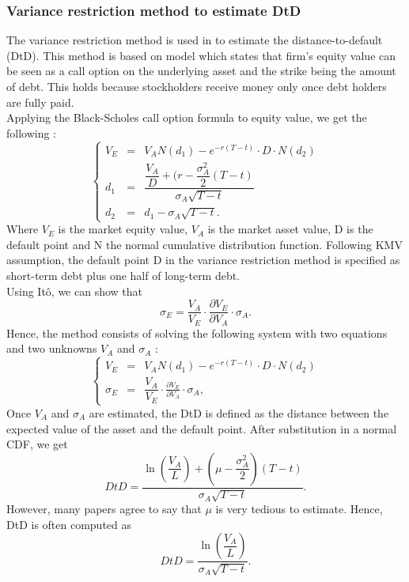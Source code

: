 \subsubsection{Variance restriction method to estimate DtD}
The variance restriction method is used in \citet{DSW} to estimate the distance-to-default (DtD). This method is based on \citet{Merton1974} model which states that firm's equity value can be seen as a call option on the underlying asset and the strike being the amount of debt. This holds because stockholders receive money only once debt holders are fully paid. \\
Applying the Black-Scholes call option formula to equity value, we get the following :
\begin{equation*}
\left\{
  \begin{array}{lll}
    V_E & = & V_A N(d_1) - e^{-r(T-t)} \cdot D \cdot N(d_2)\\
    d_1 & = & \dfrac{\dfrac{V_A}{D}+(r-\dfrac{\sigma_A^2}{2}(T-t)}{\sigma_A \sqrt{T-t}} \\
    d_2 & = & d_1 - \sigma_A \sqrt{T-t}.
  \end{array}
\right.
\end{equation*}
Where $V_E$ is the market equity value, $V_A$ is the market asset value, D is the default point and N the normal cumulative distribution function. Following KMV assumption, the default point D in the variance restriction method is specified as short-term debt plus one half of long-term debt.\\
Using It\^o, we can show that 
\begin{equation*}
\sigma_E = \dfrac{V_A}{V_E}\cdot \frac{\partial V_E}{\partial V_A}\cdot \sigma_A.
\end{equation*}
Hence, the method consists of solving the following system with two equations and two unknowns $V_A$ and $\sigma_A$ :
\begin{equation*}
\left\{
  \begin{array}{lll}
    V_E & = & V_A N(d_1) - e^{-r(T-t)} \cdot D \cdot N(d_2)\\
    \sigma_E & = & \dfrac{V_A}{V_E}\cdot \frac{\partial V_E}{\partial V_A}\cdot \sigma_A,
  \end{array}
\right.
\end{equation*}
Once $V_A$ and $\sigma_A$ are estimated, the DtD is defined as the distance between the expected value of the asset and the default point. After substitution in a normal CDF, we get
\begin{equation}
DtD = \dfrac{\ln(\dfrac{V_A}{L})+(\mu-\dfrac{\sigma_A^2}{2})(T-t)}{\sigma_A \sqrt{T-t}}.
\end{equation}
However, many papers agree to say that $\mu$ is very tedious to estimate. Hence, DtD is often computed as
\begin{equation}
DtD = \dfrac{\ln(\dfrac{V_A}{L})}{\sigma_A \sqrt{T-t}}.
\end{equation}


